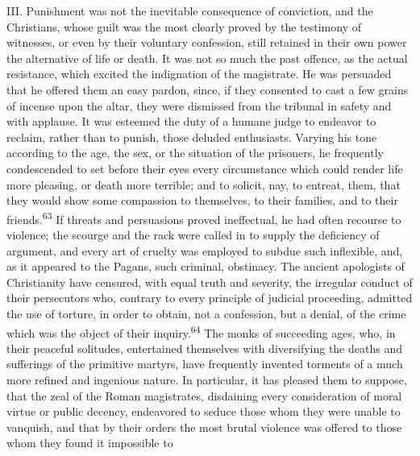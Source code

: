 

III. Punishment was not the inevitable consequence of conviction,
and the Christians, whose guilt was the most clearly proved by
the testimony of witnesses, or even by their voluntary
confession, still retained in their own power the alternative of
life or death. It was not so much the past offence, as the actual
resistance, which excited the indignation of the magistrate. He
was persuaded that he offered them an easy pardon, since, if they
consented to cast a few grains of incense upon the altar, they
were dismissed from the tribunal in safety and with applause. It
was esteemed the duty of a humane judge to endeavor to reclaim,
rather than to punish, those deluded enthusiasts. Varying his
tone according to the age, the sex, or the situation of the
prisoners, he frequently condescended to set before their eyes
every circumstance which could render life more pleasing, or
death more terrible; and to solicit, nay, to entreat, them, that
they would show some compassion to themselves, to their families,
and to their friends.\textsuperscript{63} If threats and persuasions proved
ineffectual, he had often recourse to violence; the scourge and
the rack were called in to supply the deficiency of argument, and
every art of cruelty was employed to subdue such inflexible, and,
as it appeared to the Pagans, such criminal, obstinacy. The
ancient apologists of Christianity have censured, with equal
truth and severity, the irregular conduct of their persecutors
who, contrary to every principle of judicial proceeding, admitted
the use of torture, in order to obtain, not a confession, but a
denial, of the crime which was the object of their inquiry.\textsuperscript{64}
The monks of succeeding ages, who, in their peaceful solitudes,
entertained themselves with diversifying the deaths and
sufferings of the primitive martyrs, have frequently invented
torments of a much more refined and ingenious nature. In
particular, it has pleased them to suppose, that the zeal of the
Roman magistrates, disdaining every consideration of moral virtue
or public decency, endeavored to seduce those whom they were
unable to vanquish, and that by their orders the most brutal
violence was offered to those whom they found it impossible to

